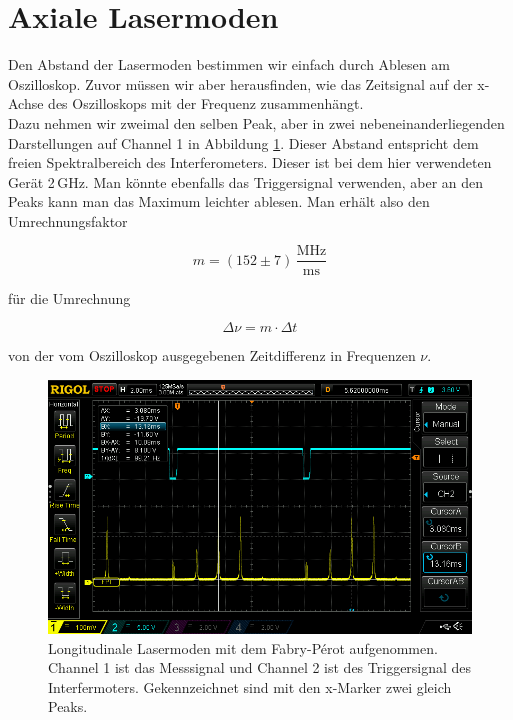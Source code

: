 \section{Axiale Lasermoden}

Den Abstand der Lasermoden bestimmen wir einfach durch Ablesen am Oszilloskop. Zuvor müssen wir aber herausfinden, wie das Zeitsignal auf der 
x-Achse des Oszilloskops mit der Frequenz zusammenhängt.\\

Dazu nehmen wir zweimal den selben Peak, aber in zwei nebeneinanderliegenden Darstellungen auf Channel 1 in Abbildung \ref{bild:FreierSpektralbereich}.
Dieser Abstand entspricht dem freien Spektralbereich des Interferometers. Dieser ist bei dem hier verwendeten Gerät 2\,GHz. Man könnte ebenfalls das Triggersignal verwenden, 
aber an den Peaks kann man das Maximum leichter ablesen. Man erhält also den Umrechnungsfaktor 

\begin{equation*}
    m = (152 \pm 7)\,\frac{\mathrm{MHz}}{\mathrm{ms}}
\end{equation*}

für die Umrechnung 

\begin{equation}
    \Delta \nu = m\cdot \Delta t
    \label{eq:Umrechnung}
\end{equation}

von der vom Oszilloskop ausgegebenen Zeitdifferenz in Frequenzen $\nu$.


\begin{figure}[ht]
    \centering
    \includegraphics[width = \linewidth]{Bilder/Auswertung/FabryPerotKalibr.png}
    \caption{Longitudinale Lasermoden mit dem Fabry-Pérot aufgenommen. Channel 1 ist das Messsignal und Channel 2 ist des Triggersignal des Interfermoters. Gekennzeichnet sind 
    mit den x-Marker zwei gleich Peaks.}
    \label{bild:FreierSpektralbereich}
\end{figure}


